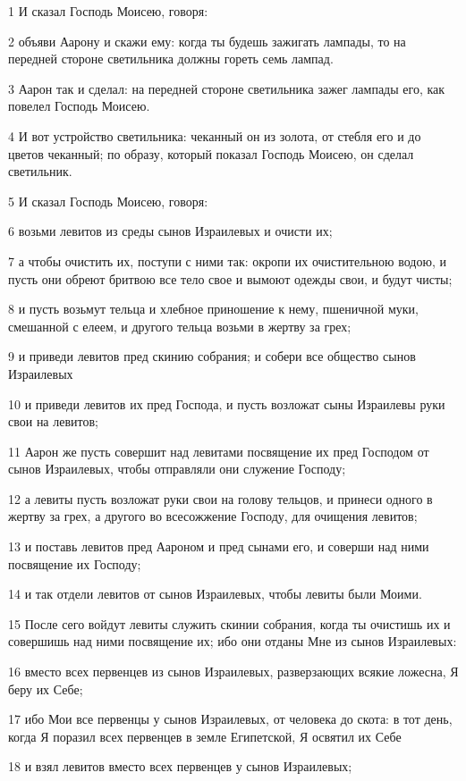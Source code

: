\par 1 И сказал Господь Моисею, говоря:
\par 2 объяви Аарону и скажи ему: когда ты будешь зажигать лампады, то на передней стороне светильника должны гореть семь лампад.
\par 3 Аарон так и сделал: на передней стороне светильника зажег лампады его, как повелел Господь Моисею.
\par 4 И вот устройство светильника: чеканный он из золота, от стебля его и до цветов чеканный; по образу, который показал Господь Моисею, он сделал светильник.
\par 5 И сказал Господь Моисею, говоря:
\par 6 возьми левитов из среды сынов Израилевых и очисти их;
\par 7 а чтобы очистить их, поступи с ними так: окропи их очистительною водою, и пусть они обреют бритвою все тело свое и вымоют одежды свои, и будут чисты;
\par 8 и пусть возьмут тельца и хлебное приношение к нему, пшеничной муки, смешанной с елеем, и другого тельца возьми в жертву за грех;
\par 9 и приведи левитов пред скинию собрания; и собери все общество сынов Израилевых
\par 10 и приведи левитов их пред Господа, и пусть возложат сыны Израилевы руки свои на левитов;
\par 11 Аарон же пусть совершит над левитами посвящение их пред Господом от сынов Израилевых, чтобы отправляли они служение Господу;
\par 12 а левиты пусть возложат руки свои на голову тельцов, и принеси одного в жертву за грех, а другого во всесожжение Господу, для очищения левитов;
\par 13 и поставь левитов пред Аароном и пред сынами его, и соверши над ними посвящение их Господу;
\par 14 и так отдели левитов от сынов Израилевых, чтобы левиты были Моими.
\par 15 После сего войдут левиты служить скинии собрания, когда ты очистишь их и совершишь над ними посвящение их; ибо они отданы Мне из сынов Израилевых:
\par 16 вместо всех первенцев из сынов Израилевых, разверзающих всякие ложесна, Я беру их Себе;
\par 17 ибо Мои все первенцы у сынов Израилевых, от человека до скота: в тот день, когда Я поразил всех первенцев в земле Египетской, Я освятил их Себе
\par 18 и взял левитов вместо всех первенцев у сынов Израилевых;
